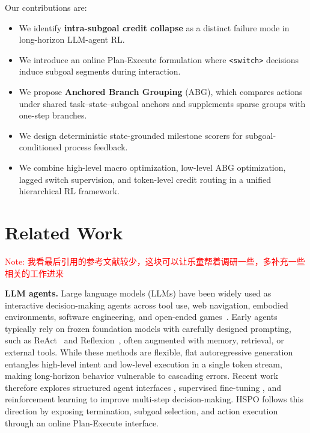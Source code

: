 \documentclass{article}
\newcommand{\wei}[1]{\textcolor{red}{#1}}
\begin{document}
Our contributions are:
\begin{itemize}
    \item We identify \textbf{intra-subgoal credit collapse} as a distinct failure mode in long-horizon LLM-agent RL.
    \item We introduce an online Plan-Execute formulation where \texttt{<switch>} decisions induce subgoal segments during interaction.
    \item We propose \textbf{Anchored Branch Grouping} (ABG), which compares actions under shared task--state--subgoal anchors and supplements sparse groups with one-step branches.
    \item We design deterministic state-grounded milestone scorers for subgoal-conditioned process feedback.
    \item We combine high-level macro optimization, low-level ABG optimization, lagged switch supervision, and token-level credit routing in a unified hierarchical RL framework.
\end{itemize}



\section{Related Work} \wei{Note: 我看最后引用的参考文献较少，这块可以让乐童帮着调研一些，多补充一些相关的工作进来}
\label{sec:relwork}

\textbf{LLM agents.}
Large language models (LLMs) have been widely used as interactive decision-making agents across tool use, web navigation, embodied environments, software engineering, and open-ended games~\cite{yao2022react,shinn2023reflexion,wang2024voyager}. Early agents typically rely on frozen foundation models with carefully designed prompting, such as ReAct~\cite{yao2022react} and Reflexion~\cite{shinn2023reflexion}, often augmented with memory, retrieval, or external tools. While these methods are flexible, flat autoregressive generation entangles high-level intent and low-level execution in a single token stream, making long-horizon behavior vulnerable to cascading errors. Recent work therefore explores structured agent interfaces \cite{xxx,yyy}, supervised fine-tuning \cite{xxx,yyy}, and reinforcement learning \cite{xxx,yyy} to improve multi-step decision-making. HSPO follows this direction by exposing termination, subgoal selection, and action execution through an online Plan-Execute interface.
\end{document}

